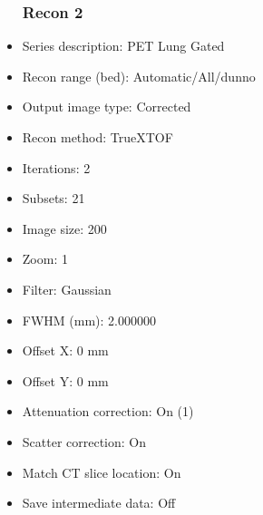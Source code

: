 \documentclass[12pt]{article}
\begin{document}
\begin{itemize}
\subsubsection{Recon 2}
\item Series description: PET Lung Gated
\item Recon range (bed): Automatic/All/dunno
\item Output image type: Corrected
\item Recon method: TrueXTOF
\item Iterations: 2
\item Subsets: 21
\item Image size: 200
\item Zoom: 1
\item Filter: Gaussian
\item FWHM (mm): 2.000000
\item Offset X: 0 mm
\item Offset Y: 0 mm
\item Attenuation correction: On (1)
\item Scatter correction: On
\item Match CT slice location: On
\item Save intermediate data: Off
\end{itemize}
\end{document}
